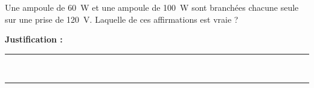 Une ampoule de \qty{60}{W} et une ampoule de \qty{100}{W} sont branchées chacune seule sur une prise de \qty{120}{V}. Laquelle de ces affirmations est vraie ?

\choices

\noindent\textbf{Justification :} \hrulefill \\[2.5ex]
\rule{\linewidth}{0.4pt} \\[2.5ex]
\rule{\linewidth}{0.4pt}
\vfill
